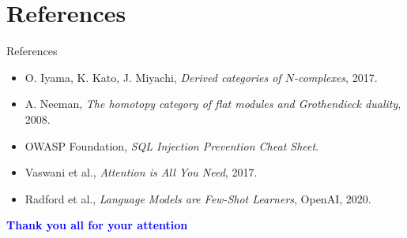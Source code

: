 \documentclass[t,ignorenonframetext]{beamer}
\begin{document}
\section{References}
\begin{frame}{References}
\tiny
\begin{itemize}
\item O. Iyama, K. Kato, J. Miyachi, \textit{Derived categories of $N$-complexes}, 2017.
\item A. Neeman, \textit{The homotopy category of flat modules and Grothendieck duality}, 2008.
\item OWASP Foundation, \textit{SQL Injection Prevention Cheat Sheet}.
\item Vaswani et al., \textit{Attention is All You Need}, 2017.
\item Radford et al., \textit{Language Models are Few-Shot Learners}, OpenAI, 2020.
\end{itemize}
\end{frame}

\begin{frame}
\vspace{3cm}
\begin{center}
\begin{LARGE}
\textcolor{blue}{\textbf{Thank you all for your attention}}
\end{LARGE}
\end{center}
\end{frame}
\end{document}
